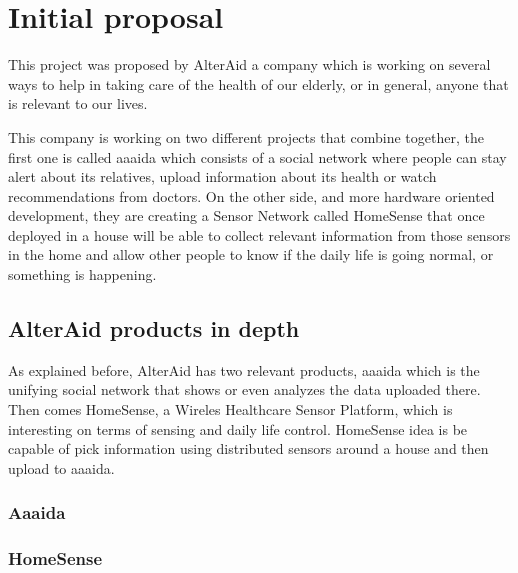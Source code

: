 \chapter{Initial proposal}\label{C:innitial-proposal}
This project was proposed by AlterAid a company which is working on several ways to help in taking care of the health of our elderly, or in general, anyone that is relevant to our lives.

This company is working on two different projects that combine together, the first one is called aaaida which consists of a social network where people can stay alert about its relatives, upload information about its health or watch recommendations from doctors. On the other side, and more hardware oriented development, they are creating a Sensor Network called HomeSense that once deployed in a house will be able to collect relevant information from those sensors in the home and allow other people to know if the daily life is going normal, or something is happening.


\section{AlterAid products in depth}\label{S:alteraid-products}
As explained before, AlterAid has two relevant products, aaaida which is the unifying social network that shows or even analyzes
the data uploaded there. Then comes HomeSense, a Wireles Healthcare Sensor Platform, which is interesting on terms of sensing and daily life control. HomeSense idea is be capable of pick information using distributed sensors around a house and then upload to aaaida.

\subsection{Aaaida}\label{SS:Aaaida-proposal}


\subsection{HomeSense}\label{SS:HomeSense-proposal}


